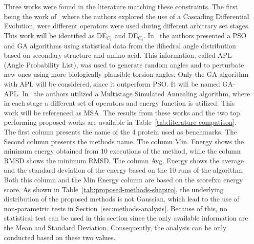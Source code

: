 Three works were found in the literature matching these constraints. The first being the work of~\cite{narloch2017protein} where the authors explored the use of a Cascading Differential Evolution, were different operators were used during different arbitrary set stages. This work will be identified as DE$_{C_1}$ and DE$_{C_2}$. In~\cite{borguesan2015apl} the authors presented a PSO and GA algorithms using statistical data from the dihedral angle distribution based on secondary structure and amino acid.
This information, called APL (Angle Probability List), was used to generate random angles and to perturbate new ones using more biologically plausible torsion angles. Only the GA algorithm with APL will be considered, since it outperform PSO. It will be named GA-APL.
In~\cite{silva2018multistage} the authors utilized a Multistage Simulated Annealing algorithm, where in each stage a different set
of operators and energy function is utilized. This work will be referenced as MSA. The results from these works and the two top performing proposed works are available in Table~\ref{tab:literature-compatison}. The first column presents the name
of the 4 protein used as benchmarks. The Second column presents the methods name.
The column Min. Energy shows the minimum energy obtained from 10 executions
of the method, while the column \ac{RMSD} shows the minimum \ac{RMSD}. The column
Avg. Energy shows the average and the standard deviation of the energy based
on the 10 runs of the algorithm. Both this column and the Min Energy column
are based on the scorefxn energy score.
As shown in Table~\ref{tab:proposed-methods-shapiro}, the underlying distribution of the proposed methods
is not Gaussian, which lead to the use of non-parametric tests in Section~\ref{sec:methods-analysis}.
Because of this, no statistical test can be used in this section since the only available information
are the Mean and Standard Deviation.
Consequently, the analysis can be only conducted based on these two values.



